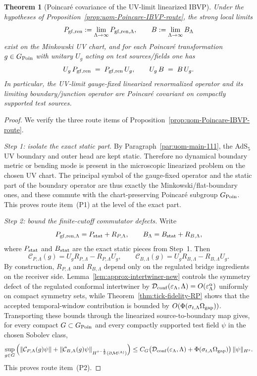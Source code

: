 \documentclass[10pt]{article}
\theoremstyle{definition}
\theoremstyle{plain}
\newtheorem{theorem}{Theorem}[section]
\begin{document}
\begin{theorem}[Poincar\'e covariance of the UV-limit linearized IBVP]
\label{thm:uom-Poincare-IBVP}
Under the hypotheses of Proposition~\ref{prop:uom-Poincare-IBVP-route}, the strong local limits
\[
P_{\rm gf,ren}:=\lim_{\Lambda\to\infty} P_{{\rm gf,ren},\Lambda},
\qquad
B:=\lim_{\Lambda\to\infty} B_\Lambda
\]
exist on the Minkowski UV chart, and for each Poincar\'e transformation $g\in G_{\rm Poin}$ with unitary $U_g$ acting on test sources/fields one has
\[
U_g\,P_{\rm gf,ren}\;=\;P_{\rm gf,ren}\,U_g,
\qquad
U_g\,B\;=\;B\,U_g.
\]
In particular, the UV-limit gauge-fixed linearized renormalized operator and its limiting boundary/junction operator are Poincar\'e covariant on compactly
supported test sources.
\end{theorem}

\begin{proof}
We verify the three route items of Proposition~\ref{prop:uom-Poincare-IBVP-route}.

\emph{Step 1: isolate the exact static part.}
By Paragraph~\ref{par:uom-main-111}, the AdS$_5$ UV boundary and outer head are kept static.  Therefore no dynamical boundary metric or bending mode is
present in the microscopic linearized problem on the chosen UV chart.  The principal symbol of the gauge-fixed operator and the static part of the
boundary operator are thus exactly the Minkowski/flat-boundary ones, and these commute with the chart-preserving Poincar\'e subgroup $G_{\rm Poin}$.
This proves route item~\textnormal{(P1)} at the level of the exact part.

\emph{Step 2: bound the finite-cutoff commutator defects.}
Write
\[
P_{{\rm gf,ren},\Lambda}=P_{\rm stat}+R_{P,\Lambda},
\qquad
B_\Lambda=B_{\rm stat}+R_{B,\Lambda},
\]
where $P_{\rm stat}$ and $B_{\rm stat}$ are the exact static pieces from Step~1.  Then
\[
\mathcal C_{P,\Lambda}(g)=U_gR_{P,\Lambda}-R_{P,\Lambda}U_g,
\qquad
\mathcal C_{B,\Lambda}(g)=U_gR_{B,\Lambda}-R_{B,\Lambda}U_g.
\]
By construction, $R_{P,\Lambda}$ and $R_{B,\Lambda}$ depend only on the regulated bridge ingredients on the receiver side.  Lemma~\ref{lem:approx-intertwiner-new}
controls the symmetry defect of the regulated conformal intertwiner by
\(
\mathcal D_{\rm conf}(\varepsilon_\Lambda,\Lambda)=O(\varepsilon_\Lambda^\alpha)
\)
uniformly on compact symmetry sets, while Theorem~\ref{thm:tick-fidelity-RP} shows that the accepted temporal-window contribution is bounded by
\(
O(\Phi(\sigma_{t,\Lambda}\Omega_{\rm gap}))
\).
Transporting these bounds through the linearized source-to-boundary map gives, for every compact $G\subset G_{\rm Poin}$ and every compactly supported
test field $\psi$ in the chosen Sobolev class,
\[
\sup_{g\in G}\Big(\|\mathcal C_{P,\Lambda}(g)\psi\|+\|\mathcal C_{B,\Lambda}(g)\psi\|_{H^{s-\frac12}(\partial\mathcal M^{(\Lambda)})}\Big)
\le
C_G\big(\mathcal D_{\rm conf}(\varepsilon_\Lambda,\Lambda)+\Phi(\sigma_{t,\Lambda}\Omega_{\rm gap})\big)\,\|\psi\|_{H^s}.
\]
This proves route item~\textnormal{(P2)}.


\end{proof}
\end{document}
